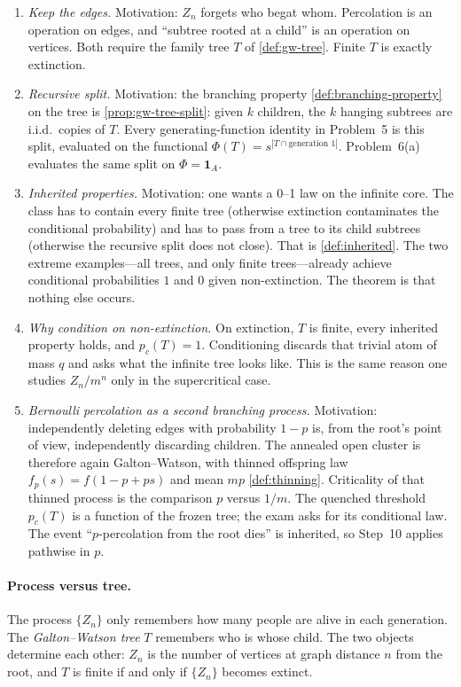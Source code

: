 \documentclass[11pt,a4paper]{article}
\begin{document}
\begin{enumerate}[label=\textup{Step~\arabic*.}, start=8]
    \item
    \emph{Keep the edges.} Motivation: \(Z_n\) forgets who begat whom. Percolation is an operation on edges, and ``subtree rooted at a child'' is an operation on vertices. Both require the family tree \(T\) of \cref{def:gw-tree}. Finite \(T\) is exactly extinction.
    \item
    \emph{Recursive split.} Motivation: the branching property \cref{def:branching-property} on the tree is \cref{prop:gw-tree-split}: given \(k\) children, the \(k\) hanging subtrees are i.i.d.\ copies of \(T\). Every generating-function identity in Problem~5 is this split, evaluated on the functional \(\Phi(T)=s^{|T\cap\text{generation }1|}\). Problem~6(a) evaluates the same split on \(\Phi=\mathbf{1}_A\).
    \item
    \emph{Inherited properties.} Motivation: one wants a 0--1 law on the infinite core. The class has to contain every finite tree (otherwise extinction contaminates the conditional probability) and has to pass from a tree to its child subtrees (otherwise the recursive split does not close). That is \cref{def:inherited}. The two extreme examples---all trees, and only finite trees---already achieve conditional probabilities \(1\) and \(0\) given non-extinction. The theorem is that nothing else occurs.
    \item
    \emph{Why condition on non-extinction.} On extinction, \(T\) is finite, every inherited property holds, and \(p_c(T)=1\). Conditioning discards that trivial atom of mass \(q\) and asks what the infinite tree looks like. This is the same reason one studies \(Z_n/m^n\) only in the supercritical case.
    \item
    \emph{Bernoulli percolation as a second branching process.} Motivation: independently deleting edges with probability \(1-p\) is, from the root's point of view, independently discarding children. The annealed open cluster is therefore again Galton--Watson, with thinned offspring law \(f_p(s)=f(1-p+ps)\) and mean \(mp\) \cref{def:thinning}. Criticality of that thinned process is the comparison \(p\) versus \(1/m\). The quenched threshold \(p_c(T)\) is a function of the frozen tree; the exam asks for its conditional law. The event ``\(p\)-percolation from the root dies'' is inherited, so Step~10 applies pathwise in \(p\).
\end{enumerate}

\paragraph{Process versus tree.}
The process \(\{Z_n\}\) only remembers how many people are alive in each generation. The \emph{Galton--Watson tree} \(T\) remembers who is whose child. The two objects determine each other: \(Z_n\) is the number of vertices at graph distance \(n\) from the root, and \(T\) is finite if and only if \(\{Z_n\}\) becomes extinct.
\end{document}
